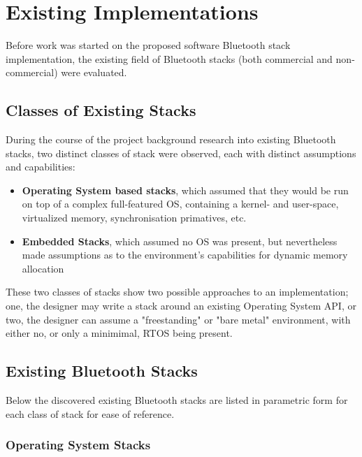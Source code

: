 \chapter{Existing Implementations}
\label{Chapter 2}

Before work was started on the proposed software Bluetooth stack implementation, the existing field of Bluetooth stacks (both commercial and non-commercial) were evaluated.

\section{Classes of Existing Stacks}

During the course of the project background research into existing Bluetooth stacks, two distinct classes of stack were observed, each with distinct assumptions and capabilities:

\begin{itemize}
	\item \textbf{Operating System based stacks}, which assumed that they would be run on top of a complex full-featured OS, containing a kernel- and user-space, virtualized memory, synchronisation primatives, etc.
	\item \textbf{Embedded Stacks}, which assumed no OS was present, but nevertheless made assumptions as to the environment's capabilities for dynamic memory allocation
\end{itemize}

These two classes of stacks show two possible approaches to an implementation; one, the designer may write a stack around an existing Operating System API, or two, the designer can assume a "freestanding" or "bare metal" environment, with either no, or only a minimimal, RTOS being present.

\section{Existing Bluetooth Stacks}

Below the discovered existing Bluetooth stacks are listed in parametric form for each class of stack for ease of reference.

\subsection{Operating System Stacks}

